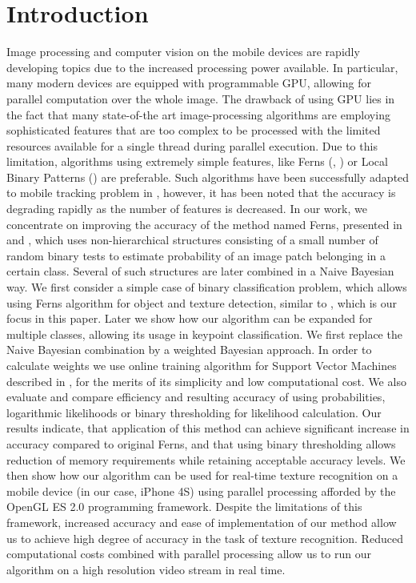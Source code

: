 \documentclass[10pt,twocolumn, a4paper]{article}
\begin{document}
\section{Introduction}
\label{Intro}
Image processing and computer vision on the mobile devices are rapidly developing topics due to the increased processing power available. In particular, many modern devices are equipped with programmable GPU, allowing for parallel computation over the whole image. The drawback of using GPU lies in the fact that many state-of-the art image-processing algorithms are employing sophisticated features that are too complex to be processed with the limited resources available for a single thread during parallel execution. Due to this limitation, algorithms using extremely simple features, like Ferns (\cite{Ferns1}, \cite{Ferns2}) or Local Binary Patterns (\cite{LBP}) are preferable. Such algorithms have been successfully adapted to mobile tracking problem in \cite{Mobi}, however, it has been noted that the accuracy is degrading rapidly as the number of features is decreased.
In our work, we concentrate on improving the accuracy of the method named Ferns, presented in \cite{Ferns1} and \cite{Ferns2}, which uses non-hierarchical structures consisting of a small number of random binary tests to estimate probability of an image patch belonging in a certain class. Several of such structures are later combined in a Naive Bayesian way. 
We first consider a simple case of binary classification problem, which allows using Ferns algorithm for object and texture detection, similar to \cite{LBP}, which is our focus in this paper.  Later we show how our algorithm can be expanded for multiple classes, allowing its usage in keypoint classification.
We first replace the Naive Bayesian combination by a weighted Bayesian approach. In order to calculate weights we use online training algorithm for Support Vector Machines described in \cite{Norma}, for the merits of its simplicity and low computational cost.
We also evaluate and compare efficiency and resulting accuracy of using probabilities, logarithmic likelihoods or binary thresholding for likelihood calculation. Our results indicate, that application of this method can achieve significant increase in accuracy compared to original Ferns, and that using binary thresholding allows reduction of memory requirements while retaining acceptable accuracy levels.
 We then show how our algorithm can be used for real-time texture recognition on a mobile device (in our case, iPhone 4S) using parallel processing afforded by the OpenGL ES 2.0 programming framework. Despite the limitations of this framework, increased accuracy and ease of implementation of our method allow us to achieve high degree of accuracy in the task of texture recognition. Reduced computational costs  combined with parallel processing allow us to run our algorithm on a high resolution video stream in real time.
\end{document}
